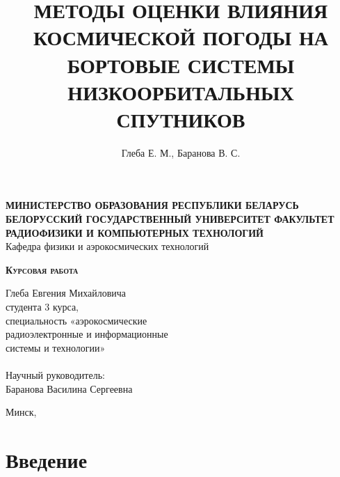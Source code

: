 \documentclass[12pt, a4paper]{extreport}
\title{МЕТОДЫ ОЦЕНКИ ВЛИЯНИЯ КОСМИЧЕСКОЙ ПОГОДЫ НА БОРТОВЫЕ СИСТЕМЫ НИЗКООРБИТАЛЬНЫХ СПУТНИКОВ}
\author{Глеба Е. М., Баранова В. С.}
\date{\the\year}
\begin{document}
\begin{titlepage}
    \begin{center}
        \Large \textbf{МИНИСТЕРСТВО ОБРАЗОВАНИЯ РЕСПУБЛИКИ БЕЛАРУСЬ БЕЛОРУССКИЙ ГОСУДАРСТВЕННЫЙ УНИВЕРСИТЕТ
            ФАКУЛЬТЕТ РАДИОФИЗИКИ И КОМПЬЮТЕРНЫХ ТЕХНОЛОГИЙ
        } \\
        Кафедра физики и аэрокосмических технологий
    \end{center}

    \vspace{5em}

    \begin{center}
        \Huge \textsc{\textbf{Курсовая работа}}
    \end{center}

    \begin{center}
        \Large \thetitle
    \end{center}

    \vspace{2em}

    \hfill
    \parbox{14em}{
        Глеба Евгения Михайловича \\
        студента 3 курса, \\
        специальность «аэрокосмические \\
        радиоэлектронные и информационные \\
        системы и технологии» \\
        \\
        Научный руководитель: \\
        Баранова Василина Сергеевна \\
    }


    \begin{center}
        Минск, \thedate
    \end{center}

\end{titlepage}

\tableofcontents

\newpage

\section{Введение}
\end{document}
